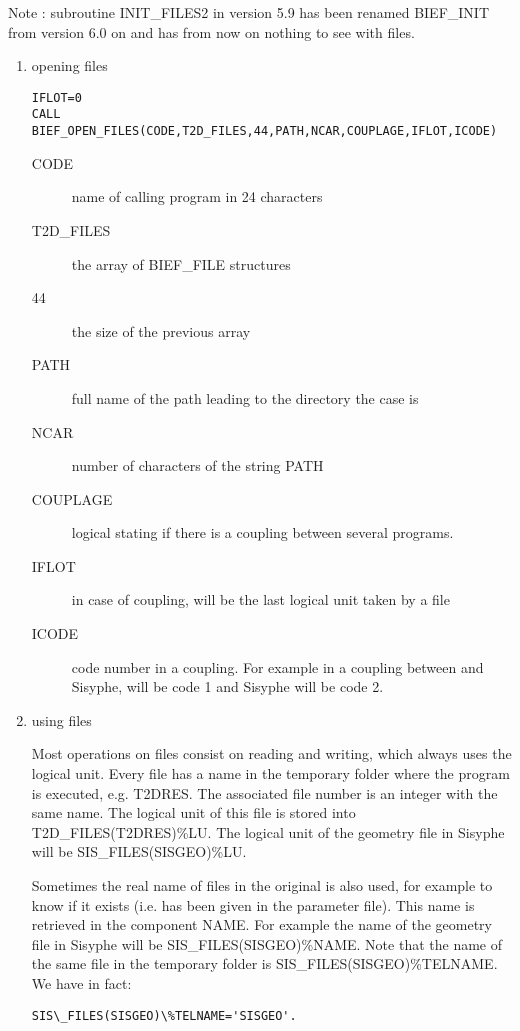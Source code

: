Note : subroutine INIT\_FILES2 in \bief version 5.9 has been renamed BIEF\_INIT
from version 6.0 on and has from now on nothing to see with files.
\begin{enumerate}
  \item{opening files}

\begin{lstlisting}[language=TelFortran]
IFLOT=0
CALL BIEF_OPEN_FILES(CODE,T2D_FILES,44,PATH,NCAR,COUPLAGE,IFLOT,ICODE)
\end{lstlisting}
\begin{description}
  \item [CODE] name of calling program in 24 characters
  \item [T2D\_FILES] the array of BIEF\_FILE structures
  \item [44] the size of the previous array
  \item [PATH] full name of the path leading to the directory the case is
  \item [NCAR] number of characters of the string PATH
  \item [COUPLAGE] logical stating if there is a coupling between several programs.
  \item [IFLOT] in case of coupling, will be the last logical unit taken by a file
  \item [ICODE] code number in a coupling. For example in a coupling between
     and Sisyphe,  will be code 1 and Sisyphe will be
    code 2.
\end{description}
\item using files

Most operations on files consist on reading and writing, which always uses the
logical unit. Every file has a name in the temporary folder where the program
is executed, e.g. T2DRES. The associated file number is an integer with the
same name. The logical unit of this file is stored into T2D\_FILES(T2DRES)\%LU.
The logical unit of the geometry file in Sisyphe will be
SIS\_FILES(SISGEO)\%LU.

Sometimes the real name of files in the original is also used, for example to
know if it exists (i.e. has been given in the parameter file). This name is
retrieved in the component NAME. For example the name of the geometry file in
Sisyphe will be SIS\_FILES(SISGEO)\%NAME. Note that the name of the same file
in the temporary folder is SIS\_FILES(SISGEO)\%TELNAME. We have in fact:

\begin{lstlisting}[language=TelFortran]
SIS\_FILES(SISGEO)\%TELNAME='SISGEO'.
\end{lstlisting}


\end{enumerate}
